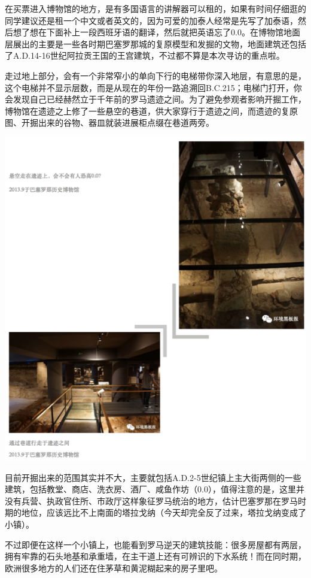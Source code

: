\documentclass[
]{book}
\begin{document}
在买票进入博物馆的地方，是有多国语言的讲解器可以租的，如果有时间仔细逛的同学建议还是租一个中文或者英文的，因为可爱的加泰人经常是先写了加泰语，然后想了想在下面补上一段西班牙语的翻译，然后就把英语忘了0.0。在博物馆地面层展出的主要是一些各时期巴塞罗那城的复原模型和发掘的文物，地面建筑还包括了A.D.14-16世纪阿拉贡王国的王宫建筑，不过都不算是本次寻访的重点啦。

走过地上部分，会有一个非常窄小的单向下行的电梯带你深入地层，有意思的是，这个电梯并不显示层数，而是从现在的年份一路追溯回B.C.215；电梯门打开，你会发现自己已经赫然立于千年前的罗马遗迹之间。为了避免参观者影响开掘工作，博物馆在遗迹之上修了一些悬空的巷道，供大家穿行于遗迹之间，而遗迹的复原图、开掘出来的谷物、器皿就装进展柜点缀在巷道两旁。

\includegraphics[width=7.78in]{images/xt15}

目前开掘出来的范围其实并不大，主要就包括A.D.2-5世纪镇上主大街两侧的一些建筑，包括教堂、商店、洗衣房、酒厂、咸鱼作坊（0.0），值得注意的是，这里并没有兵营、执政官住所、市政厅这样象征罗马统治的地方，估计巴塞罗那在罗马时期的地位，应该远比不上南面的塔拉戈纳（今天却完全反了过来，塔拉戈纳变成了小镇）。

不过即便在这样一个小镇上，也能看到罗马逆天的建筑技能：很多房屋都有两层，拥有牢靠的石头地基和承重墙，在主干道上还有可辨识的下水系统！而在同时期，欧洲很多地方的人们还在住茅草和黄泥糊起来的房子里吧。
\end{document}
